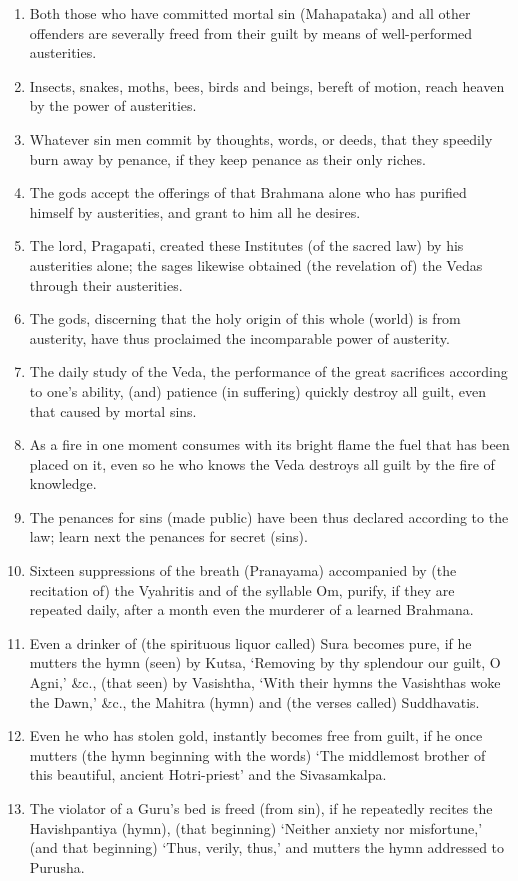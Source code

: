 \begin{enumerate}
\item Both those who have committed mortal sin (Mahapataka) and all other offenders are severally freed from their guilt by means of well-performed austerities.
\item Insects, snakes, moths, bees, birds and beings, bereft of motion, reach heaven by the power of austerities.
\item Whatever sin men commit by thoughts, words, or deeds, that they speedily burn away by penance, if they keep penance as their only riches.
\item The gods accept the offerings of that Brahmana alone who has purified himself by austerities, and grant to him all he desires.
\item The lord, Pragapati, created these Institutes (of the sacred law) by his austerities alone; the sages likewise obtained (the revelation of) the Vedas through their austerities.
\item The gods, discerning that the holy origin of this whole (world) is from austerity, have thus proclaimed the incomparable power of austerity.
\item The daily study of the Veda, the performance of the great sacrifices according to one's ability, (and) patience (in suffering) quickly destroy all guilt, even that caused by mortal sins.
\item As a fire in one moment consumes with its bright flame the fuel that has been placed on it, even so he who knows the Veda destroys all guilt by the fire of knowledge.
\item The penances for sins (made public) have been thus declared according to the law; learn next the penances for secret (sins).
\item Sixteen suppressions of the breath (Pranayama) accompanied by (the recitation of) the Vyahritis and of the syllable Om, purify, if they are repeated daily, after a month even the murderer of a learned Brahmana.
\item Even a drinker of (the spirituous liquor called) Sura becomes pure, if he mutters the hymn (seen) by Kutsa, `Removing by thy splendour our guilt, O Agni,' \&c., (that seen) by Vasishtha, `With their hymns the Vasishthas woke the Dawn,' \&c., the Mahitra (hymn) and (the verses called) Suddhavatis.
\item Even he who has stolen gold, instantly becomes free from guilt, if he once mutters (the hymn beginning with the words) `The middlemost brother of this beautiful, ancient Hotri-priest' and the Sivasamkalpa.
\item The violator of a Guru's bed is freed (from sin), if he repeatedly recites the Havishpantiya (hymn), (that beginning) `Neither anxiety nor misfortune,' (and that beginning) `Thus, verily, thus,' and mutters the hymn addressed to Purusha.

\end{enumerate}
